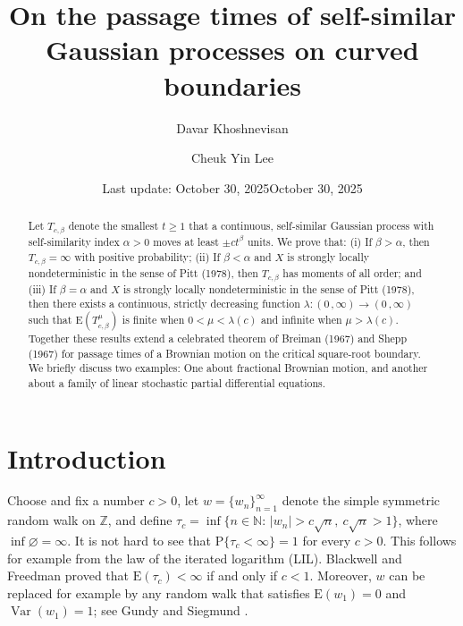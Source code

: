 \documentclass[reqno]{amsart}
\author[D. Khoshnevisan and C.Y. Lee]{Davar Khoshnevisan \and Cheuk Yin Lee}
\title[Self-similar Gaussian processes on curved boundaries]{On the passage times of self-similar
	Gaussian processes on curved boundaries}
\date{Last update: October 30, 2025}
\date{October 30, 2025}
\DeclareMathOperator{\Var}{Var}
\newcommand{\<}{\langle}
\renewcommand{\>}{\rangle}
\newcommand{\N}{\mathbb{N}}
\newcommand{\Z}{\mathbb{Z}}
\renewcommand{\P}{\mathrm{P}}
\newcommand{\E}{\mathrm{E}}
\newcommand{\1}{\mathbb{1}}
\renewcommand{\ge}{\geqslant}
\theoremstyle{definition}
\numberwithin{equation}{section}
\begin{document}
\maketitle
\setcounter{tocdepth}{3}%
\let\oldtocsection=\tocsection
\let\oldtocsubsection=\tocsubsection
\let\oldtocsubsubsection=\tocsubsubsection

\renewcommand{\tocsection}[2]{\hspace{0em}\oldtocsection{#1}{#2}}
\renewcommand{\tocsubsection}[2]{\hspace{2.5em}\oldtocsubsection{#1}{#2}}
\begin{abstract} 
	Let $T_{c,\beta}$ denote the smallest $t\ge1$
	that a continuous, self-similar Gaussian process with self-similarity
	index $\alpha>0$ moves at least $\pm  c t^\beta$ units.
	We prove that: (i) If $\beta>\alpha$, then 
	$T_{c,\beta}=\infty$ with positive probability;
	(ii) If $\beta<\alpha$ and $X$ is strongly locally nondeterministic 
	in the sense of Pitt (1978), then $T_{c,\beta}$
	has moments of all order;  and 
	(iii) If $\beta=\alpha$ and $X$ is strongly locally nondeterministic in the sense of Pitt (1978), then there exists a continuous,
	strictly decreasing  function 
	$\lambda:(0\,,\infty)\to(0\,,\infty)$ such that $\mathrm{E}(T_{c,\beta}^\mu)$ is finite
	when $0<\mu<\lambda(c)$ and infinite when $\mu>\lambda(c)$. Together these results
	extend a celebrated theorem of Breiman (1967)
	and Shepp (1967) for passage times
	of a Brownian motion on the critical square-root boundary.
	We briefly discuss two examples: One about fractional Brownian motion, and another
	about a family of linear stochastic partial differential equations.\end{abstract}

\section{Introduction}

Choose and fix a number $c>0$,
let $w=\{w_n\}_{n=1}^\infty$ denote the simple symmetric random walk on $\Z$, and define
$\tau_c  =\inf\{n\in\N:\, |w_n|>c \sqrt n,\ c\sqrt n >1\}$, where
$\inf\varnothing=\infty$. It is not hard to see that
$\P\{\tau_c <\infty\}=1$ for every $c>0$. This follows for example from the law of the iterated
logarithm (LIL). Blackwell and Freedman \cite{BlackwellFreedman} proved  that
$\E(\tau_c)<\infty $ if and only if $c<1.$
Moreover, $w$ can be replaced for example by any random walk that
satisfies $\E(w_1)=0$
and $\Var(w_1)=1$; see Gundy and Siegmund  \cite{GundySiegmund}.
\end{document}
